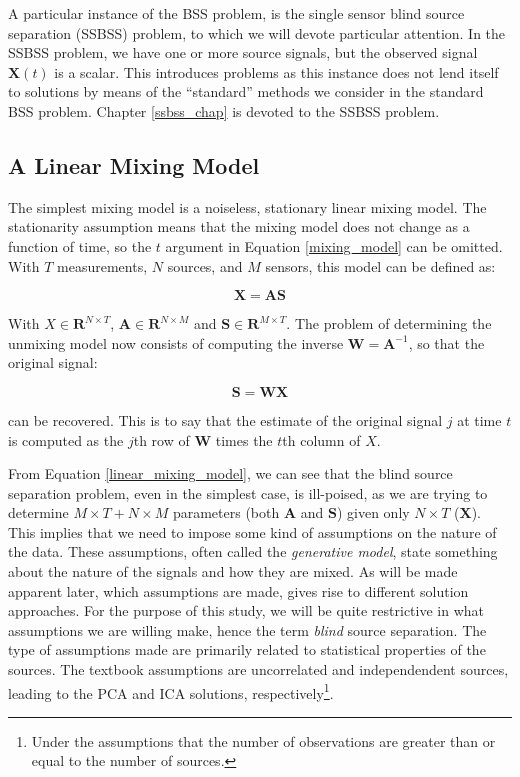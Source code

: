 \documentclass[11pt, oneside, a4paper]{report}
\begin{document}
A particular instance of the BSS problem, is the single sensor blind source separation (SSBSS) problem, to which we will devote particular attention. In the SSBSS problem, we have one or more source signals, but the observed signal $\boldsymbol{X}(t)$ is a scalar. This introduces problems as this instance does not lend itself to solutions by means of the ``standard'' methods we consider in the standard BSS problem. Chapter \ref{ssbss_chap} is devoted to the SSBSS problem.

\subsection{A Linear Mixing Model}

The simplest mixing model is a noiseless, stationary linear mixing model. The stationarity assumption means that the mixing model does not change as a function of time, so the $t$ argument in Equation \ref{mixing_model} can be omitted. With $T$ measurements, $N$ sources, and $M$ sensors, this model can be defined as:


\begin{equation}\label{linear_mixing_model}
 \boldsymbol{X} = \boldsymbol{A}\boldsymbol{S}
\end{equation}

With $\boldsymbol{}X \in \mathbf{R}^{N\times T}$, $\boldsymbol{A} \in \mathbf{R}^{N\times M}$
and $\boldsymbol{S} \in \mathbf{R}^{M\times T}$. The problem of determining the
unmixing model now consists of computing the inverse $\boldsymbol{W} = \boldsymbol{A}^{-1}$, so
that the original signal:

\begin{equation}\label{linear_unmixing_model}
\boldsymbol{S} = \boldsymbol{W}\boldsymbol{X}
\end{equation}

can be recovered. This is to say that the estimate of the original
signal $j$ at time $t$ is computed as the $j$th row of $\boldsymbol{W}$ times the
$t$th column of $X$.

From Equation \ref{linear_mixing_model}, we can see that the blind source separation problem, even in the simplest case, is ill-poised, as we are trying to determine $M\times T + N\times M$ parameters (both $\boldsymbol{A}$ and $\boldsymbol{S}$) given only $N\times T$ ($\boldsymbol{X}$). This implies that we need to impose some kind of assumptions on the nature of the data. These assumptions, often called the \emph{generative model}, state something about the nature of the signals and how they are mixed. As will be made apparent later, which assumptions are made, gives rise to different solution approaches. For the purpose of this study, we will be quite restrictive in what assumptions we are willing make, hence the term \emph{blind} source separation. The type of assumptions made are primarily related to statistical properties of the sources. The textbook assumptions are uncorrelated and independendent sources, leading to the PCA and ICA solutions, respectively\footnote{Under the assumptions that the number of observations are greater than or equal to the number of sources.}.
\end{document}
